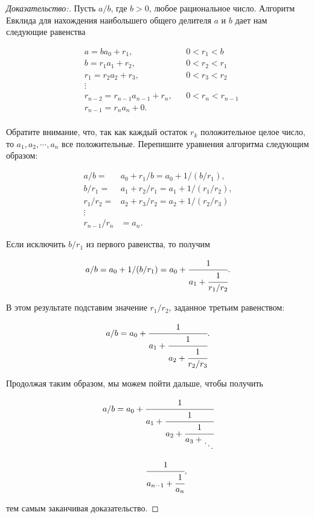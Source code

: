 \documentclass{article}
\begin{document}
\begin{proof}[Доказательство:]
	Пусть $a/b$, где $b>0$, любое рациональное число. Алгоритм Евклида для нахождения наибольшего общего делителя $a$ и $b$ дает нам следующие равенства\\
	
	\begin{center}
		\begin{align*}
		&a=ba_0 + r_1, &&0<r_1<b\\ 			
		&b=r_1a_1 + r_2, &&0<r_2<r_1\\
		&r_1=r_2a_2 + r_3, &&0<r_3<r_2\\
		&\vdots\\
		&r_{n-2}=r_{n-1}a_{n-1} + r_n, &&0<r_n<r_{n-1}\\
		&r_{n-1}=r_na_n + 0.\\		
		\end{align*}
	\end{center}
	
	Обратите внимание, что, так как каждый остаток $r_k$ положительное целое число, то $a_1,a_2,\cdots,a_n$ все положительные. Перепишите уравнения алгоритма следующим образом:\\
	
	\begin{center}
		\begin{align*}
		a/b=&a_0 + r_1/b=a_0 + 1/(b/r_1),\\
		b/r_1=&a_1 + r_2/r_1=a_1 + 1/(r_1/r_2),\\
		r_1/r_2=&a_2 + r_3/r_2=a_2 + 1/(r_2/r_3)\\
		\vdots\\
		r_{n-1}/r_n&=a_n.			
		\end{align*}
	\end{center}
	
	Если исключить $b/r_1$ из первого равенства, то	получим
	
	\[a/b=a_0 + 1/(b/r_1)=a_0+\cfrac{1}{
								a_1+\cfrac{1}{r_1/r_2}}.\]
							
	В этом результате подставим значение $r_1/r_2$, заданное третьим равенством:
	
	\[a/b=a_0+\cfrac{1}{
				a_1+\cfrac{1}{
					a_2+\cfrac{1}{r_2/r_3}}}.\]
				
	\newpage
	\lhead{\textbf{\thepage}}
	
	\noindent Продолжая таким образом, мы можем пойти дальше, чтобы получить
	
	 \[a/b=a_0+\cfrac{1}{
		a_1+\cfrac{1}{
			a_2+\cfrac{1}{
				a_3+
					\rotatebox{180}{$\ddots$}}}}\]
	\begin{align*}
	&&&&\cfrac{1}{a_{n-1}+\cfrac{1}{a_n}},
	\end{align*}
		
	тем самым заканчивая доказательство.	
	
\end{proof}
\end{document}
